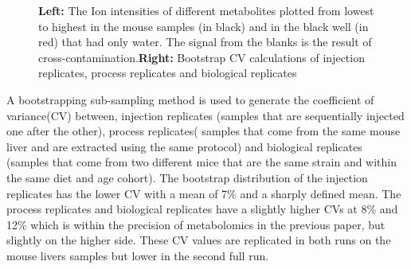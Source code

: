 \documentclass[a4paper,11pt,twoside]{book}
\begin{document}
\begin{figure}[hbt!]
	\caption{\textbf{Left:} The Ion intensities of different metabolites plotted from lowest to highest in the mouse samples (in black) and in the black well (in red) that had only water. The signal from the blanks is the result of cross-contamination.\textbf{Right:} Bootstrap CV calculations of injection replicates, process replicates and biological replicates}
	\label{fig:Total Ion Counts}
\end{figure}
	
A bootstrapping sub-sampling method is used to generate the coefficient of variance(CV) between, injection replicates (samples that are sequentially injected one after the other), process replicates( samples that come from the same mouse liver and are extracted using the same protocol) and biological replicates (samples that come from two different mice that are the same strain and within the same diet and age cohort). The bootstrap distribution of the injection replicates has the lower CV with a mean of 7\% and a sharply defined mean. The process replicates and biological replicates have a slightly higher CVs at 8\% and 12\% which is within the precision of metabolomics in the previous paper, but slightly on the higher side. These CV values are replicated in both runs on the mouse livers samples but lower in the second full run.
	
\end{document}
